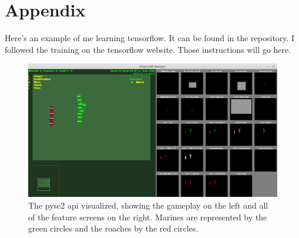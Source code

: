 \documentclass{amsart}
\theoremstyle{definition}
\begin{document}

\section{Appendix}


Here's an example of me learning tensorflow.
It can be found in the repository.
I followed the training on the tensorflow website.
Those instructions will go here.


\begin{figure}[h!]
    \includegraphics[width=1.0\linewidth]{gameplay}
    \caption{The pysc2 api visualized, showing the gameplay on the left and all of the feature screens on the right. Marines are represented by the green circles and the roaches by the red circles.}
\end{figure}
\end{document}
